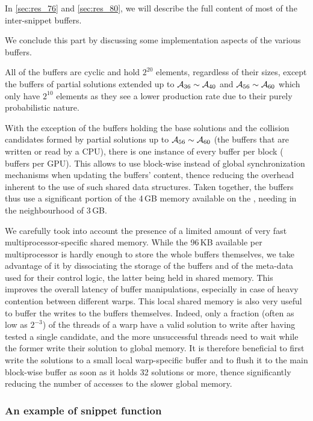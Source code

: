 In \autoref{sec:res_76} and \autoref{sec:res_80}, we will describe the full content of most of the inter-snippet buffers.

\bigskip

We conclude this part by discussing some implementation aspects of the various buffers.

All of the buffers are cyclic and hold $2^{20}$ elements, regardless of their sizes, except the buffers of partial solutions extended up to
$\mathcal{A}_{36} \sim \mathcal{A}_{40}$ and $\mathcal{A}_{56} \sim \mathcal{A}_{60}$ which only have $2^{10}$ elements as they see a lower production rate due to their purely probabilistic nature.

With the exception of the buffers holding the base solutions and the collision candidates formed by partial solutions
up to $\mathcal{A}_{56} \sim \mathcal{A}_{60}$ (\ie the buffers that are written or read by a CPU),
there is one instance of every buffer per block ( buffers per GPU). This allows to use block-wise instead of global
synchronization mechanisms when updating the buffers' content,
thence reducing the overhead inherent to the use of such shared data structures.
Taken together, the buffers thus use a significant portion of the 4\,GB memory available on the \gtx, needing in the neighbourhood of 3\,GB.

We carefully took into account the presence of a limited amount of
very fast multi\-processor-specific shared memory. While the 96\,KB available per multiprocessor is
hardly enough to store the whole buffers themselves, we take advantage of it by dissociating the storage of
the buffers and of the meta-data used for their control logic, the latter being held in
shared memory. This improves the overall latency of buffer manipulations, especially in case of
heavy contention between different warps. This local shared memory is also very useful to buffer
the writes to the buffers themselves. Indeed, only a fraction (often as low as $2^{-3}$)
of the threads of a warp have a valid solution to write after having tested a single candidate,
and the more unsuccessful threads need to wait while the former write their solution to global memory.
It is therefore beneficial to first write the solutions to a small local warp-specific buffer and to
flush it to the main block-wise buffer as soon as it holds 32 solutions or more, thence
significantly reducing the number of accesses to the slower global memory.


\subsubsection{An example of snippet function}
\label{sec:snippet}

